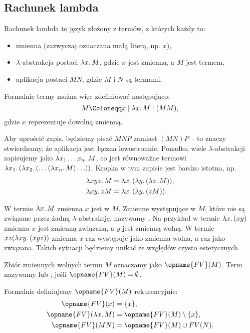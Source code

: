 \documentclass[polish,pretty]{angav}
\newcommand{\FV}{\opname{FV}}
\begin{document}
\subsection{Rachunek lambda}

Rachunek lambda to język złożony z termów, z których każdy to:
\begin{itemize}
    \item zmienna (zazwyczaj oznaczana małą literą, np. $x$),
    \item $\lambda$-abstrakcja postaci $\lambda x\ldotp M$, gdzie $x$ jest zmienną, a $M$ jest termem,
    \item aplikacja postaci $MN$, gdzie $M$ i $N$ są termami.
\end{itemize}

Formalnie termy można więc zdefiniować następująco:
\[ M \Coloneqq x \mid \lambda x\ldotp M \mid (MM), \]
gdzie $x$ reprezentuje dowolną zmienną.

Aby uprościć zapis, będziemy pisać $MNP$ zamiast $(MN)P$ -- to znaczy stwierdzamy, że aplikacja jest łączna lewostronnie. Ponadto, wiele $\lambda$-abstrakcji zapisujemy jako $\lambda x_1 \ldots x_n\ldotp M$, co jest równoważne termowi $\lambda x_1\ldotp (\lambda x_2\ldotp (\ldots (\lambda x_n\ldotp M) \ldots))$. Kropka w tym zapisie jest bardzo istotna, np.
\begin{align*}
    \lambda xyz\ldotp M &= \lambda x\ldotp (\lambda y\ldotp (\lambda z\ldotp M)), \\
    \lambda xy\ldotp z M &= \lambda x\ldotp (\lambda y\ldotp (z M)).
\end{align*}

W termie $\lambda x\ldotp M$ zmienna $x$ jest  w $M$.
Zmienne występujące w $M$, które nie są związane przez żadną $\lambda$-abstrakcję, nazywamy .
Na przykład w termie $\lambda x\ldotp (x y)$ zmienna $x$ jest zmienną związaną, a $y$ jest zmienną wolną.
W termie $xz(\lambda xy\ldotp (xyz))$ zmienna $x$ raz występuje jako zmienna wolna, a raz jako związana. Takich sytuacji będziemy unikać ze względów czysto estetycznych.

Zbiór zmiennych wolnych termu $M$ oznaczamy jako $\FV(M)$.
Term nazywamy  lub , jeśli $\FV(M) = \emptyset$.

\begin{remark}
    Formalnie definiujemy $\FV(M)$ rekurencyjnie:
    \begin{align*}
        \FV(x) &= \{x\}, \\
        \FV(\lambda x\ldotp M) &= \FV(M) \setminus \{x\}, \\
        \FV(MN) &= \FV(M) \cup FV(N).
    \end{align*}
\end{remark}
\end{document}
